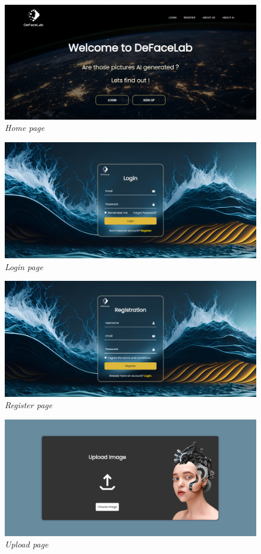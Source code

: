\begin{figure}[ht]
    \centering
    \includegraphics[width= 6in]{img/web-home.png}
    \caption{\textit{Home page}}
\end{figure}

\begin{figure}[ht]
    \centering
    \includegraphics[width= 6in]{img/web-login.png}
    \caption{\textit{Login page}}
\end{figure}
\begin{figure}[ht]
    \centering
    \includegraphics[width= 6in]{img/web-register.png}
    \caption{\textit{Register page}}
\end{figure}
\begin{figure}[ht]
    \centering
    \includegraphics[width= 6in]{img/web-upload.png}
    \caption{\textit{Upload page}}
\end{figure}